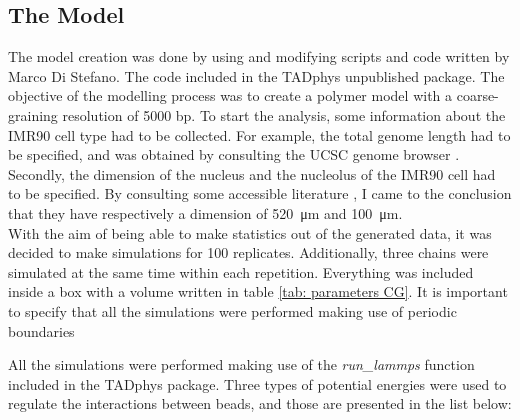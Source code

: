 
\subsection{The Model} \label{chap: the model description}
The model creation was done by using and modifying scripts and code written by Marco Di Stefano. The code included in the TADphys unpublished package.
The objective of the modelling process was to create a polymer model with a coarse-graining resolution of 5000 bp. To start the analysis, some information about the IMR90 cell type had to be collected. For example, the total genome length had to be specified, and was obtained by consulting the UCSC genome browser
\cite{UCSCGenomeBrowser}.
Secondly, the dimension of the nucleus and the nucleolus of the IMR90 cell had to be specified. By consulting some accessible literature
\cite{ehlerHumanFoetalLung1996,ingramHiCImplementationGenome2020,maiserSuperresolutionSituAnalysis2020},
I came to the conclusion that they have respectively a dimension of \SI{520}{\micro\metre} and \SI{100}{\micro\metre}.\\

With the aim of being able to make statistics out of the generated data, it was decided to make simulations for 100 replicates. Additionally, three chains were simulated at the same time within each repetition. Everything was included inside a box with a volume written in table \ref{tab: parameters CG}. 
It is important to specify that all the simulations were performed making use of periodic boundaries %

All the simulations were performed making use of the \textit{run\_lammps} function included in the TADphys package.
Three types of potential energies were used to regulate the interactions between beads, and those are presented in the list below:

